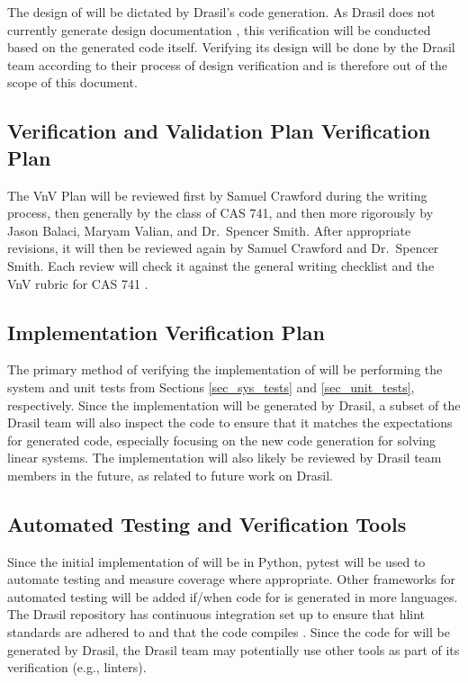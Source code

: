 \documentclass[12pt, titlepage]{article}
\begin{document}
The design of \progname{} will be dictated by Drasil's code generation. As
Drasil does not currently generate design documentation , this
verification will be conducted based on the generated code itself. Verifying
its design will be done by the Drasil team according to their process of design
verification and is therefore out of the scope of this document.

\subsection{Verification and Validation Plan Verification Plan}

The VnV Plan will be reviewed first by Samuel Crawford during the writing
process, then generally by the class of CAS 741, and then more rigorously by
Jason Balaci, Maryam Valian, and Dr.~Spencer Smith. After appropriate
revisions, it will then be reviewed again by Samuel Crawford and Dr.~Spencer
Smith. Each review will check it against the general writing checklist
and the VnV rubric for CAS 741 .

\subsection{Implementation Verification Plan}

The primary method of verifying the implementation of \progname{} will be
performing the system and unit tests from Sections \ref{sec_sys_tests} and
\ref{sec_unit_tests}, respectively. Since the implementation will be
generated by Drasil, a subset of the Drasil team will also inspect the code to
ensure that it matches the expectations for generated code, especially focusing
on the new code generation for solving linear systems.
The implementation will also likely be reviewed by Drasil team members in the
future, as related to future work on Drasil.

\subsection{Automated Testing and Verification Tools}

Since the initial implementation of \progname{} will be in Python, pytest will
be used to automate testing and measure coverage where appropriate. Other
frameworks for automated testing will be added if/when code for \progname{} is
generated in more languages. The Drasil repository has continuous integration
set up to ensure that hlint standards are adhered to and that the code
compiles . Since the code for \progname{} will be generated
by Drasil, the Drasil team may potentially use other tools as part of its
verification (e.g., linters). 
\end{document}
